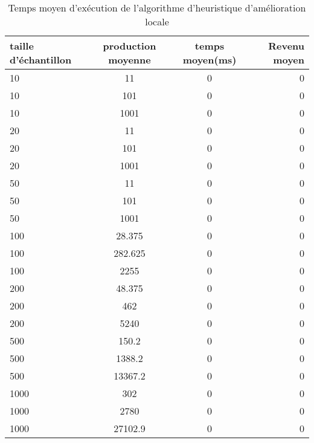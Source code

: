 \documentclass[a4paper, 12pt]{article} %
\begin{document}
\begin{table}[H]
\caption{Temps moyen d'exécution de l'algorithme d'heuristique d'amélioration locale}
\centering
\begin{tabular}{| l | c | c | r |}
\hline
taille d'échantillon & production moyenne & temps moyen(ms)  & Revenu moyen\\
\hline
10 & 11 & 0 & 0\\
\hline
10 & 101 & 0 & 0\\
\hline
10 & 1001 & 0 & 0\\
\hline
20 & 11 & 0 & 0\\
\hline
20 & 101 & 0 & 0\\
\hline
20 & 1001 & 0 & 0\\
\hline
50 & 11 & 0 & 0\\
\hline
50 & 101 & 0 & 0\\
\hline
50 & 1001 & 0 & 0\\
\hline
100 & 28.375 & 0 & 0\\
\hline
100 & 282.625 & 0 & 0\\
\hline
100 & 2255 & 0 & 0\\
\hline
200 & 48.375 & 0 & 0\\
\hline
200 & 462 & 0 & 0\\
\hline
200 & 5240 & 0 & 0\\
\hline
500 & 150.2 & 0& 0\\
\hline
500 & 1388.2 & 0 & 0\\
\hline
500 & 13367.2 & 0 & 0\\
\hline
1000 & 302 & 0 & 0\\
\hline
1000 & 2780 & 0 & 0\\
\hline
1000 & 27102.9 & 0 & 0\\
\hline
\end{tabular}
\end{table}
\end{document}
